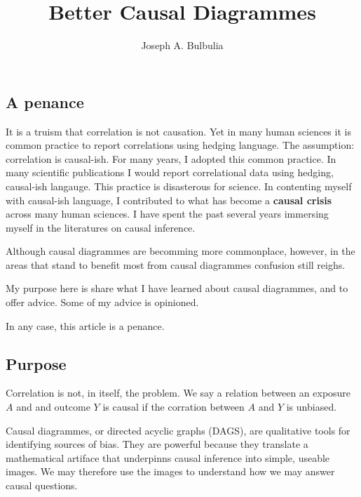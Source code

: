 \documentclass[
  singlecolumn]{report}
\title{Better Causal Diagrammes}
\author{Joseph A. Bulbulia}
\date{}
\begin{document}
\maketitle
\ifdefined\Shaded\renewenvironment{Shaded}{\begin{tcolorbox}[breakable, interior hidden, borderline west={3pt}{0pt}{shadecolor}, sharp corners, enhanced, boxrule=0pt, frame hidden]}{\end{tcolorbox}}\fi

\listoffigures
\listoftables
\hypertarget{a-penance}{%
\subsection{A penance}\label{a-penance}}

It is a truism that correlation is not causation. Yet in many human
sciences it is common practice to report correlations using hedging
language. The assumption: correlation is causal-ish. For many years, I
adopted this common practice. In many scientific publications I would
report correlational data using hedging, causal-ish langauge. This
practice is disasterous for science. In contenting myself with
causal-ish language, I contributed to what has become a \textbf{causal
crisis} across many human sciences. I have spent the past several years
immersing myself in the literatures on causal inference.

Although causal diagrammes are becomming more commonplace, however, in
the areas that stand to benefit most from causal diagrammes confusion
still reighs.

My purpose here is share what I have learned about causal diagrammes,
and to offer advice. Some of my advice is opinioned.

In any case, this article is a penance.

\hypertarget{purpose}{%
\subsection{Purpose}\label{purpose}}

Correlation is not, in itself, the problem. We say a relation between an
exposure \(A\) and and outcome \(Y\) is causal if the corration between
\(A\) and \(Y\) is unbiased.

Causal diagrammes, or directed acyclic graphs (DAGS), are qualitative
tools for identifying sources of bias. They are powerful because they
translate a mathematical artiface that underpinns causal inference into
simple, useable images. We may therefore use the images to understand
how we may answer causal questions.
\end{document}
